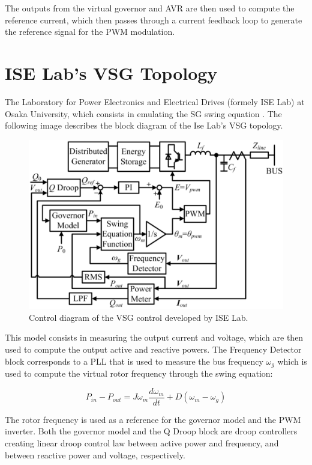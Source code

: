 The outputs from the virtual governor and AVR are then used to compute the
reference current, which then passes through a current feedback loop to generate
the reference signal for the PWM modulation.

\section{ISE Lab's VSG Topology}
The Laboratory for Power Electronics and Electrical Drives (formely ISE Lab) at
Osaka University, which consists in emulating the SG swing equation
\cite{sakimoto2011stabilization,shintai2012reactive}. The following image
describes the block diagram of the Ise Lab's VSG topology.

\begin{figure}[h!]
    \centering
    \includegraphics[width=14cm]{images/ISE.png}
    \caption{Control diagram of the VSG control developed by ISE Lab\cite{liu2016studies}.}
    \label{fig:ISE}
\end{figure}

This model consists in measuring the output current and voltage, which are then
used to compute the output active and reactive powers. The Frequency Detector
block corresponds to a PLL that is used to measure the bus frequency $\omega_g$
which is used to compute the virtual rotor frequency through the swing equation:

\begin{equation*}
    P_{in} - P_{out} = J\omega_m \frac{d\omega_m}{dt} + D(\omega_m - \omega_g)
\end{equation*}

The rotor frequency is used as a reference for the governor model and the PWM
inverter. Both the governor model and the Q Droop block are droop controllers
creating linear droop control law between active power and frequency, and
between reactive power and voltage, respectively.

